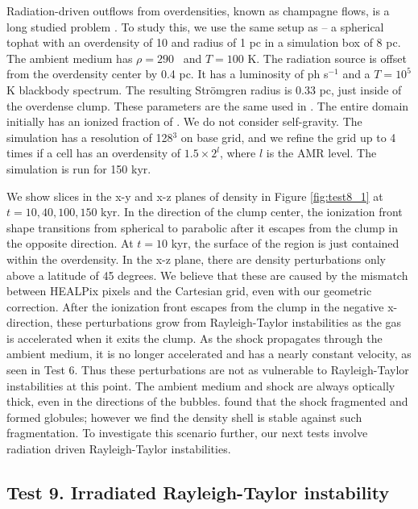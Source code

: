 \documentclass[useAMS,usenatbib]{mn2e}
\begin{document}
Radiation-driven outflows from overdensities, known as champagne
flows, is a long studied problem \citep[e.g.][\S3.3]{Yorke86}.  To
study this, we use the same setup as \citet{Bisbas09} -- a spherical
tophat with an overdensity of 10 and radius of 1 pc in a simulation
box of 8 pc.  The ambient medium has $\rho = 290$ \cubecm~and $T =
100$ K.  The radiation source is offset from the overdensity center by
0.4 pc.  It has a luminosity of  ph s$^{-1}$ and a $T=10^5$
K blackbody spectrum.  The resulting Str\"{o}mgren radius is 0.33 pc,
just inside of the overdense clump.  These parameters are the same
used in \citet{Bisbas09}.  The entire domain initially has an ionized
fraction of .  We do not consider self-gravity.  The
simulation has a resolution of 128$^3$ on base grid, and we refine the
grid up to 4 times if a cell has an overdensity of $1.5 \times 2^l$,
where $l$ is the AMR level.  The simulation is run for 150 kyr.

We show slices in the x-y and x-z planes of density in Figure
\ref{fig:test8_1} at $t = 10, 40, 100, 150$ kyr.  In the direction of
the clump center, the ionization front shape transitions from
spherical to parabolic after it escapes from the clump in the opposite
direction.  At $t = 10$ kyr, the surface of the \hii region is
just contained within the overdensity.  In the x-z plane, there are
density perturbations only above a latitude of 45 degrees.  We believe
that these are caused by the mismatch between HEALPix pixels and the
Cartesian grid, even with our geometric correction.  After the
ionization front escapes from the clump in the negative x-direction,
these perturbations grow from Rayleigh-Taylor instabilities as the gas
is accelerated when it exits the clump.  As the shock propagates
through the ambient medium, it is no longer accelerated and has a
nearly constant velocity, as seen in Test 6.  Thus these perturbations
are not as vulnerable to Rayleigh-Taylor instabilities at this point.
The ambient medium and shock are always optically thick, even in the
directions of the bubbles.  \citeauthor{Bisbas09} found that the shock
fragmented and formed globules; however we find the density shell is
stable against such fragmentation.  To investigate this scenario
further, our next tests involve radiation driven Rayleigh-Taylor
instabilities.

\subsection{Test 9. Irradiated Rayleigh-Taylor instability}
\end{document}
